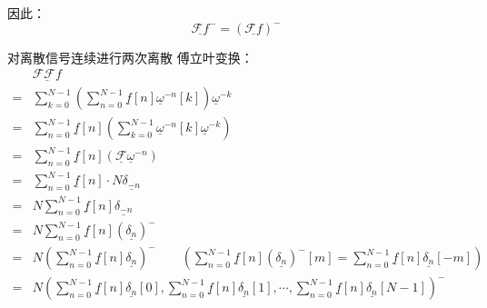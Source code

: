 因此：
\begin{equation}
	\underline{\mathcal{F}f}^- = \left( \underline{\mathcal{F}f} \right)^-
\end{equation}

对离散信号连续进行两次离散 傅立叶变换：
\begin{align*}
	  & \underline{\mathcal{F}\mathcal{F}f}                                                                                                                                                                         \\
	= & \sum_{k=0}^{N-1}\left(\sum_{n=0}^{N-1}\underline{f}[n]\underline{\omega}^{-n}[k]\right)\underline{\omega}^{-k}                                                                                              \\
	= & \sum_{n=0}^{N-1}\underline{f}[n]\left(\sum_{k=0}^{N-1}\underline{\omega}^{-n}[k]\underline{\omega}^{-k}\right)                                                                                              \\
	= & \sum_{n=0}^{N-1}\underline{f}[n]\left(\underline{\mathcal{F}}\underline{\omega}^{-n}\right)                                                                                                                 \\
	= & \sum_{n=0}^{N-1}\underline{f}[n]\cdot N\underline{\delta_{-n}}                                                                                                                                              \\
	= & N\sum_{n=0}^{N-1}\underline{f}[n]\underline{\delta_{-n}}                                                                                                                                                    \\
	= & N\sum_{n=0}^{N-1}\underline{f}[n]\left(\underline{\delta_n}\right)^-                                                                                                                                        \\
	= & N\left(\sum_{n=0}^{N-1}\underline{f}[n]\underline{\delta_n}\right)^-\qquad\left(\sum_{n=0}^{N-1}\underline{f}[n](\underline{\delta_n})^-[m]=\sum_{n=0}^{N-1}\underline{f}[n]\underline{\delta_n}[-m]\right) \\
	= & N\left(\sum_{n=0}^{N-1}\underline{f}[n]\underline{\delta_n}[0],\sum_{n=0}^{N-1}\underline{f}[n]\underline{\delta_n}[1],\cdots,\sum_{n=0}^{N-1}\underline{f}[n]\underline{\delta_n}[N-1]\right)^-
\end{align*}

